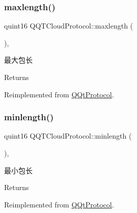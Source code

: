 \subsubsection{\texorpdfstring{maxlength()}{maxlength()}}
{\footnotesize\ttfamily quint16 Q\+Q\+T\+Cloud\+Protocol\+::maxlength (\begin{DoxyParamCaption}{ }\end{DoxyParamCaption})\hspace{0.3cm}{\ttfamily [override]}, {\ttfamily [virtual]}}



最大包长 

\begin{DoxyReturn}{Returns}

\end{DoxyReturn}


Reimplemented from \mbox{\hyperlink{class_q_qt_protocol_af41bc3116abbbcfc9af45e151a253ff7}{Q\+Qt\+Protocol}}.

\mbox{\label{class_q_q_t_cloud_protocol_a138211e39906229a3e5c6c623d04cac9}} 
\subsubsection{\texorpdfstring{minlength()}{minlength()}}
{\footnotesize\ttfamily quint16 Q\+Q\+T\+Cloud\+Protocol\+::minlength (\begin{DoxyParamCaption}{ }\end{DoxyParamCaption})\hspace{0.3cm}{\ttfamily [override]}, {\ttfamily [virtual]}}



最小包长 

\begin{DoxyReturn}{Returns}

\end{DoxyReturn}


Reimplemented from \mbox{\hyperlink{class_q_qt_protocol_a2b00f53d3dd0eed817eeecff422891f3}{Q\+Qt\+Protocol}}.

\mbox{\label{class_q_q_t_cloud_protocol_aa6b4270187fee501100e11efbedb3cab}} 
